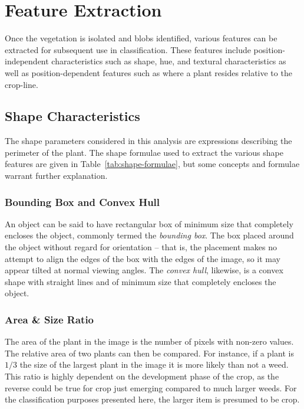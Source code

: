 \documentclass[letterpaper]{article}
\begin{document}
{{\section{Feature Extraction}
Once the vegetation is isolated and blobs identified, various features can be extracted for subsequent use in classification. These features include position-independent characteristics such as shape, hue, and textural characteristics as well as position-dependent features such as where a plant resides relative to the crop-line.  

\subsection{Shape Characteristics}
The shape parameters considered in this analysis are expressions describing the perimeter of the plant. The shape formulae used to extract the various shape features are given in Table~\ref{tab:shape-formulae}, but some concepts and formulae warrant further explanation.

\subsubsection{Bounding Box and Convex Hull}
An object can be said to have rectangular box of minimum size that completely encloses the object, commonly termed the \textit{bounding box}. The box placed around the object without regard for orientation -- that is, the placement makes no attempt to align the edges of the box with the edges of the image, so it may appear tilted at normal viewing angles. The \textit{convex hull}, likewise, is a convex shape with straight lines and of minimum size that completely encloses the object. 

\subsubsection{Area \& Size Ratio}
The area of the plant in the image is the number of pixels with non-zero values. The relative area of two plants can then be compared. For instance, if a plant is $1/3$ the size of the largest plant in the image it is more likely than not a weed. This ratio is highly dependent on the development phase of the crop, as the reverse could be true for crop just emerging compared to much larger weeds. For the classification purposes presented here, the larger item is presumed to be crop.

}}
\end{document}
